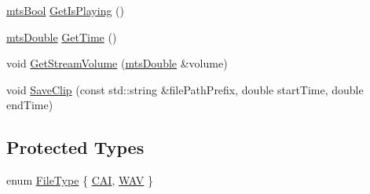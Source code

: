 \begin{DoxyCompactItemize}
\hyperlink{mts_generic_object_proxy_8h_ae2e26261f1874d4aa4ee374ece7646bd}{mts\-Bool} \hyperlink{classosa_open_a_l_a83801e2797eb2ca44d22f7a20a4b88fe}{Get\-Is\-Playing} ()
\item 
\hyperlink{mts_generic_object_proxy_8h_a31e76b0190a8d3f9838626cd7b47bd75}{mts\-Double} \hyperlink{classosa_open_a_l_a0c5ab11c0646b2a83e09c13d2864f2b1}{Get\-Time} ()
\item 
void \hyperlink{classosa_open_a_l_a3df1f6f29e0825f6a32fd7da064945b1}{Get\-Stream\-Volume} (\hyperlink{mts_generic_object_proxy_8h_a31e76b0190a8d3f9838626cd7b47bd75}{mts\-Double} \&volume)
\item 
void \hyperlink{classosa_open_a_l_a2a030267d360056f17373fc1f6a074e9}{Save\-Clip} (const std\-::string \&file\-Path\-Prefix, double start\-Time, double end\-Time)
\end{DoxyCompactItemize}
\subsection*{Protected Types}
\begin{DoxyCompactItemize}
\item 
enum \hyperlink{classosa_open_a_l_a909b566bfee85658c0108a38937545aa}{File\-Type} \{ \hyperlink{classosa_open_a_l_a909b566bfee85658c0108a38937545aaa3087f4cea2491d4626699ede1d7a1fa5}{C\-A\-I}, 
\hyperlink{classosa_open_a_l_a909b566bfee85658c0108a38937545aaa01e3105cb505f689685114c4dd4ab37c}{W\-A\-V}
 \}
\end{DoxyCompactItemize}
